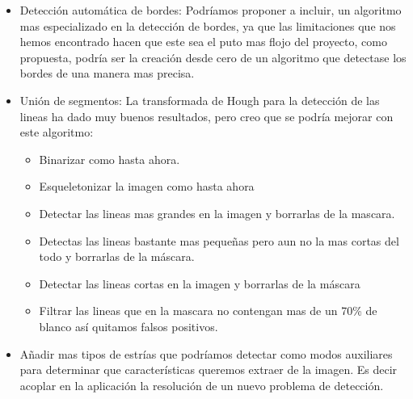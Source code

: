 \begin{itemize}
	\item Detección automática de bordes: 
Podríamos proponer a incluir, un algoritmo mas especializado en la detección de bordes, ya que las limitaciones que nos hemos encontrado hacen que este sea el puto mas flojo del proyecto, como propuesta, podría ser la creación desde cero de un algoritmo que detectase los bordes de una manera mas precisa.

	\item Unión de segmentos: 
La transformada de Hough para la detección de las lineas ha dado muy buenos resultados, pero creo que se podría mejorar con este algoritmo: 

	\begin{itemize}
		\item Binarizar como hasta ahora.
		\item Esqueletonizar la imagen como hasta ahora
		\item Detectar las lineas mas grandes en la imagen y borrarlas de la mascara.
		\item Detectas las lineas bastante mas pequeñas pero aun no la mas cortas del todo y borrarlas de la máscara.
		\item Detectar las lineas cortas en la imagen y borrarlas de la máscara
		\item Filtrar las lineas que en la mascara no contengan mas de un 70\% de blanco así quitamos falsos positivos.
	\end{itemize}
	\item Añadir mas tipos de estrías que podríamos detectar como modos auxiliares para determinar que características queremos extraer de la imagen. Es decir acoplar en la aplicación la resolución de un nuevo problema de detección.
	
\end{itemize}